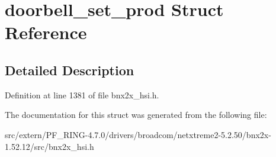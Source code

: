 \hypertarget{structdoorbell__set__prod}{
\section{doorbell\_\-set\_\-prod Struct Reference}
\label{structdoorbell__set__prod}
}


\subsection{Detailed Description}


Definition at line 1381 of file bnx2x\_\-hsi.h.



The documentation for this struct was generated from the following file:\begin{DoxyCompactItemize}
\item 
src/extern/PF\_\-RING-\/4.7.0/drivers/broadcom/netxtreme2-\/5.2.50/bnx2x-\/1.52.12/src/bnx2x\_\-hsi.h\end{DoxyCompactItemize}
